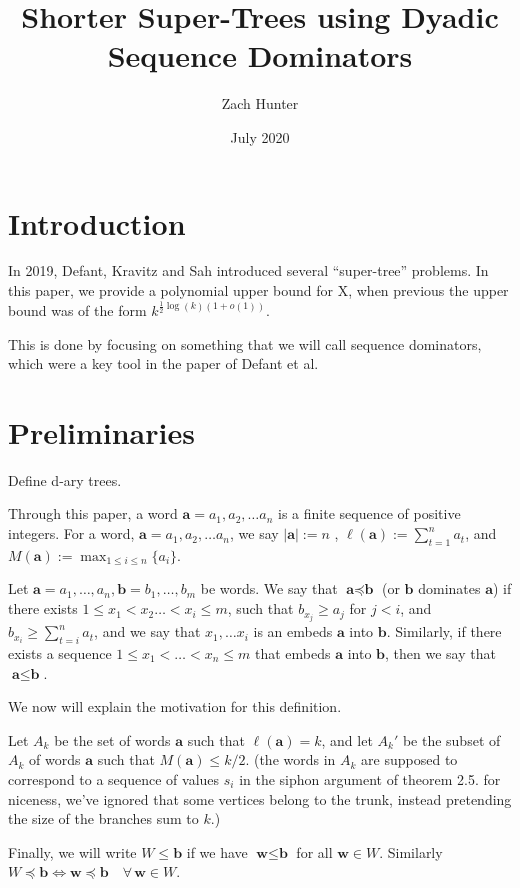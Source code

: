 \documentclass{article}
\title{Shorter Super-Trees using Dyadic Sequence Dominators}
\author{Zach Hunter}
\date{July 2020}
\newcommand{\hide}[1]{}
\begin{document}
\maketitle
\section{Introduction}

In 2019, Defant, Kravitz and Sah introduced several ``super-tree'' problems. \hide{arXiv:1908.03197v2} In this paper, we provide a polynomial upper bound for X, when previous the upper bound was of the form $k^{\frac{1}{2}\log(k)(1+o(1))}$.

This is done by focusing on something that we will call sequence dominators, which were a key tool in the paper of Defant et al.


\section{Preliminaries}

Define d-ary trees.

Through this paper, a word $\textbf{a} = a_1,a_2,\dots a_n$ is a finite sequence of positive integers. For a word, $\textbf{a} = a_1,a_2,\dots a_n$, we say $|\textbf{a}| := n$ , $\ell(\textbf{a}) := \sum_{t=1}^n a_t$, and $M(\textbf{a}):= \max_{1 \le i \le n}\{a_i\}$.

Let $\textbf{a} =a_1,\dots,a_n,\textbf{b} = b_1,\dots,b_m$ be words. We say that $\textbf{a}\preceq \textbf{b}$ (or $\textbf{b}$ dominates $\textbf{a}$) if there exists $1 \le x_1<x_2\dots <x_i\le m$, such that $b_{x_j} \ge a_j$ for $j < i$, and $b_{x_i} \ge \sum_{t=i}^n a_t$, and we say that $x_1,\dots x_i$ is an embeds $\textbf{a}$ into $\textbf{b}$. Similarly, if there exists  a sequence $1\le x_1 < \dots <x_n\le m$ that embeds $\textbf{a}$ into $\textbf{b}$, then we say that $\textbf{a}\le \textbf{b}$.


We now will explain the motivation for this definition.

Let $A_k$ be the set of words $\textbf{a}$ such that $\ell(\textbf{a})=k$, and let $A_k'$ be the subset of $A_k$ of words $\textbf{a}$ such that $M(\textbf{a}) \le k/2$. (the words in $A_k$ are supposed to correspond to a sequence of values $s_i$ in the siphon argument of theorem 2.5. for niceness, we've ignored that some vertices belong to the trunk, instead pretending the size of the branches sum to $k$.)

Finally, we will write $W\le \textbf{b}$ if we have $\textbf{w} \le \textbf{b}$ for all $\textbf{w} \in W$. Similarly $W \preceq \textbf{b} \iff \textbf{w} \preceq \textbf{b} \quad \forall \, \textbf{w} \in W$.
\end{document}
